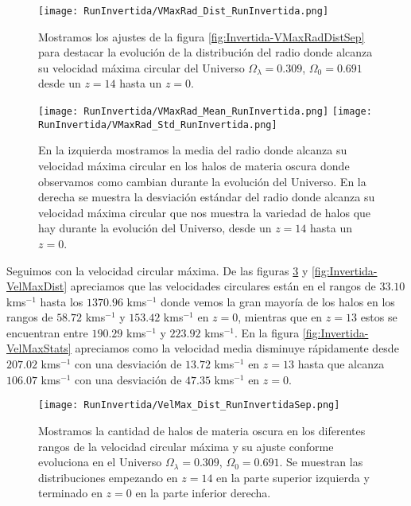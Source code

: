 \begin{figure}[H]
    \centering
    \texttt{[image: RunInvertida/VMaxRad\_Dist\_RunInvertida.png]}
    \caption[Distribución del radio donde se alcanza la velocidad máxima circular]{\footnotesize Mostramos los ajustes de la figura \ref{fig:Invertida-VMaxRadDistSep} para destacar la evolución de la distribución del radio donde alcanza su velocidad máxima circular del Universo $\Omega_\lambda = 0.309 $, $\Omega_0 = 0.691$ desde un $z=14$ hasta un $z=0$.}
    \label{fig:Invertida-VMaxRadDist}
\end{figure}

\begin{figure}[H]
    \centering
    \texttt{[image: RunInvertida/VMaxRad\_Mean\_RunInvertida.png]}
    \texttt{[image: RunInvertida/VMaxRad\_Std\_RunInvertida.png]}
    \caption[Media y desviación estándar del Radio donde se alcanza la velocidad máxima circular]{\footnotesize En la izquierda mostramos la media del radio donde alcanza su velocidad máxima circular en los halos de materia oscura donde observamos como cambian durante la evolución del Universo. En la derecha se muestra la desviación estándar del radio donde alcanza su velocidad máxima circular que nos muestra la variedad de halos que hay durante la evolución del Universo, desde un $z=14$ hasta un $z=0$.}
    \label{fig:Invertida-VMaxRadStats}
\end{figure}

Seguimos con la velocidad circular máxima. De las figuras \ref{fig:Invertida-VelMaxDistSep} y \ref{fig:Invertida-VelMaxDist} apreciamos que las velocidades circulares están en el rangos de $33.10$ kms$^{-1}$ hasta los $1370.96$ kms$^{-1}$ donde vemos la gran mayoría de los halos en los rangos de $58.72$ kms$^{-1}$ y $153.42$ kms$^{-1}$ en $z=0$, mientras que en $z=13$ estos se encuentran entre $190.29$ kms$^{-1}$ y $223.92$ kms$^{-1}$. En la figura \ref{fig:Invertida-VelMaxStats} apreciamos como la velocidad media disminuye rápidamente desde $207.02$ kms$^{-1}$ con una desviación de $13.72$ kms$^{-1}$ en $z=13$ hasta que alcanza $106.07$ kms$^{-1}$ con una desviación de $47.35$ kms$^{-1}$ en $z=0$. 

\begin{figure}[H]
    \centering
    \texttt{[image: RunInvertida/VelMax\_Dist\_RunInvertidaSep.png]}
    \caption[Velocidad circular máxima]{\footnotesize Mostramos la cantidad de halos de materia oscura en los diferentes rangos de la velocidad circular máxima y su ajuste conforme evoluciona en el Universo $\Omega_\lambda = 0.309 $, $\Omega_0 = 0.691$. Se muestran las distribuciones empezando en $z=14$ en la parte superior izquierda y terminado en $z=0$ en la parte inferior derecha.}
    \label{fig:Invertida-VelMaxDistSep}
\end{figure}

